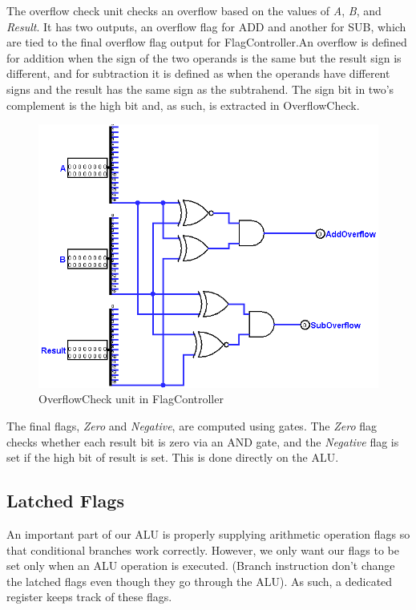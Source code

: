 \documentclass[12pt, letter]{article}
\begin{document}
	The overflow check unit checks an overflow based on the values of \textit{A}, \textit{B}, and \textit{Result}. It has two outputs, an overflow flag for ADD and another for SUB, which are tied to the final overflow flag output for FlagController.An overflow is defined for addition when the sign of the two operands is the same but the result sign is different, and for subtraction it is defined as when the operands have different signs and the result has the same sign as the subtrahend. The sign bit in two's complement is the high bit and, as such, is extracted in OverflowCheck. 
	
	\newpage
	
	\begin{figure}[t]
		\centering
		\includegraphics[scale = 0.3]{OverflowCheck}
		\caption{OverflowCheck unit in FlagController}
		\label{fig:OverflowCheck}
	\end{figure}

	The final flags, \textit{Zero} and \textit{Negative}, are computed using gates. The \textit{Zero} flag checks whether each result bit is zero via an AND gate, and the \textit{Negative} flag is set if the high bit of result is set. This is done directly on the ALU. 
	
	\subsection{Latched Flags}
	
	An important part of our ALU is properly supplying arithmetic operation flags so that conditional branches work correctly. However, we only want our flags to be set only when an ALU operation is executed. (Branch instruction don't change the latched flags even though they go through the ALU). As such, a dedicated register keeps track of these flags.
	
\end{document}
